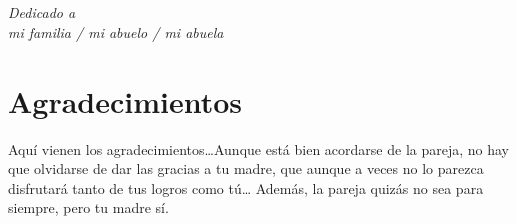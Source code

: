 \documentclass[a4paper, 12pt]{book}
\begin{document}

\chapter*{}
\begin{flushright}
\textit{Dedicado a \\
mi familia / mi abuelo / mi abuela}
\end{flushright}


\chapter*{Agradecimientos}

Aquí vienen los agradecimientos\ldots Aunque está bien acordarse de la pareja, no hay que olvidarse de dar las gracias a tu madre, que aunque a veces no lo parezca disfrutará tanto de tus logros como tú\ldots 
Además, la pareja quizás no sea para siempre, pero tu madre sí.











\tableofcontents 
\cleardoublepage
\listoffigures %
\listoftables %
\end{document}
